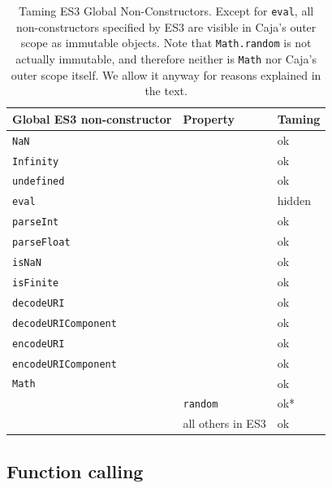 \documentclass[letterpaper,twocolumn,10pt]{article}
\newcommand{\code}[1]{{\tt {#1}}}              %
\begin{document}
\begin{table}
\begin{tabular}{lll}
  Global ES3 non-constructor & Property                   & Taming \\
  \hline
  \code{NaN}                &                             & ok \\
  \code{Infinity}           &                             & ok \\
  \code{undefined}          &                             & ok \\
  \code{eval}               &                             & hidden \\
  \code{parseInt}           &                             & ok \\
  \code{parseFloat}         &                             & ok \\
  \code{isNaN}              &                             & ok \\
  \code{isFinite}           &                             & ok \\
  \hline
  \code{decodeURI}          &                             & ok \\
  \code{decodeURIComponent} &                             & ok \\
  \code{encodeURI}          &                             & ok \\
  \code{encodeURIComponent} &                             & ok \\
  \hline
  \code{Math}               &                             & ok \\  
                            & \code{random}               & ok* \\
                            &           all others in ES3 & ok \\
\end{tabular}

\caption[Taming ES3 Global Non-Constructors.]{Taming ES3 Global 
Non-Constructors. Except for \code{eval}, all non-constructors specified by 
ES3 are visible in Caja's outer scope as immutable objects. Note that 
\code{Math.random} is not actually immutable, and therefore neither is 
\code{Math} nor Caja's outer scope itself. We allow it anyway for reasons
explained in the text.}
\label{tab:taming-es3}
\end{table}
  
\subsection{Function calling}
\end{document}
